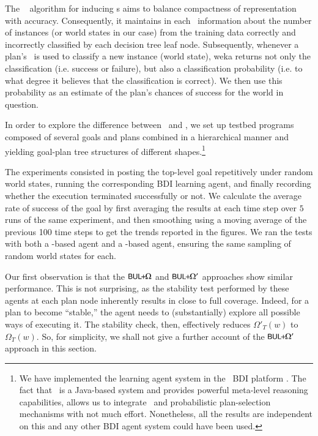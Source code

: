 The \weka\  algorithm for inducing \dt{}s aims to balance
compactness of representation with accuracy. Consequently, it maintains in each
\dt\ information about the number of instances (or world states in our case) from
the training data correctly and incorrectly classified by each decision tree leaf
node. Subsequently, whenever a plan's \dt\ is used to classify a new instance
(world state), weka returns not only the classification (i.e. success or
failure), but also a classification probability (i.e. to what degree it believes
that the classification is correct). We then use this probability as an estimate
of the plan's chances of success for the world in question.


\bigskip\bigskip

In order to explore the difference between \BUL\ and \CL, we set up testbed
programs composed of several goals and plans combined in a hierarchical manner
and yielding goal-plan tree structures of different shapes.\footnote{We have
implemented the learning agent system in the \JACK\ BDI platform
\cite{Busetta99jack}. The fact that \JACK\ is a Java-based system and
provides powerful meta-level reasoning capabilities, allows us to integrate \weka\ and
probabilistic plan-selection mechanisms with not much effort. Nonetheless, all
the results are independent on this and any other BDI agent system could
have been used.}


\bigskip\bigskip




The experiments consisted in posting the top-level goal repetitively under random
world states, running the corresponding  BDI learning agent, and finally
recording whether the execution terminated successfully or not.
We calculate the average rate of success of the goal by first averaging the
results at each time step over $5$ runs of the same experiment, and then
smoothing using a moving average of the previous 100 time steps to get the trends
reported in the figures.
We ran the tests with both a \BUL-based agent and a \CL-based agent, ensuring the
same sampling of random world states for each.





Our first observation is that the $\mbox{$\textsf{\small BUL}\!\!+\!\!\Omega$}$ and $\mbox{$\textsf{\small BUL}\!\!+\!\!\Omega'$}$ approaches show
similar performance.
This is not surprising, as the stability test performed by these agents at each
plan node inherently results in close to full coverage. Indeed, for a plan to
become ``stable,'' the agent needs to (substantially) explore all possible  ways
of executing it. The stability check, then, effectively reduces $\Omega'_T(w)$ to
$\Omega_T(w)$.
So, for simplicity, we shall not give a further account of the $\mbox{$\textsf{\small BUL}\!\!+\!\!\Omega'$}$
approach in this section.



